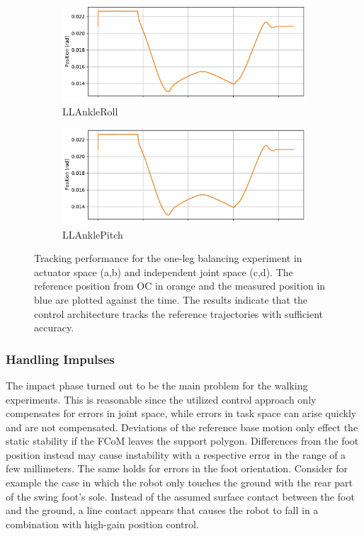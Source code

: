 \begin{figure}[h!]
\begin{subfigure}{.5\textwidth}
	\includegraphics[page=3, width=.95\linewidth]{experiments/balancing/ankleTrack}
	\caption{LLAnkleRoll}	
	\end{subfigure}%
\begin{subfigure}{.5\textwidth}
	\includegraphics[page=4, width=.95\linewidth]{experiments/balancing/ankleTrack}
	\caption{LLAnklePitch}	
\end{subfigure}%
\caption[Tracking performance for the one-leg balancing experiment]{Tracking performance for the one-leg balancing experiment in actuator space (a,b) and independent joint space (c,d). The reference position from \gls{OC} in orange and the measured position in blue are plotted against the time. The results indicate that the control architecture tracks the reference trajectories with sufficient accuracy.}
\label{exp:BalancingTracking}
\end{figure} 
\subsubsection{Handling Impulses}
The impact phase turned out to be the main problem for the walking experiments. This is reasonable since the utilized control approach only compensates for errors in joint space, while errors in task space can arise quickly and are not compensated. Deviations of the reference base motion only effect the static stability if the \gls{FCoM} leaves the support polygon. Differences from the foot position instead may cause instability with a respective error in the range of a few millimeters. The same holds for errors in the foot orientation. Consider for example the case in which the robot only touches the ground with the rear part of the swing foot's sole. Instead of the assumed surface contact between the foot and the ground, a line contact appears that causes the robot to fall in a combination with high-gain position control. 
